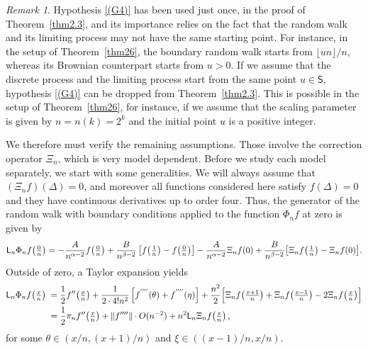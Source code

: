 \documentclass[12pt,a4paper]{article}
\theoremstyle{plain}
\theoremstyle{remark}
\newtheorem{remark}[theorem]{Remark}
\newcommand{\msf}[1]{{\mathsf #1}}
\newcommand{\pfrac}[2]{\genfrac{}{}{}{1}{#1}{#2}}
\newcommand{\pn}[1]{\big(\pfrac{#1}{n}\big)}
\begin{document}
	\begin{remark}
		\rm Hypothesis \ref{(G4)} has been used just once, in the proof of Theorem~\ref{thm2.3}, and its importance relies on the fact that the random walk and  its limiting process may not have the same starting point. For instance, in the setup of Theorem~\ref{thm26}, the boundary random walk starts from $\lfloor un\rfloor/n$, whereas its Brownian counterpart starts from $u>0$. If we assume that the discrete process and the limiting process start from the same point $u\in\msf{S}$,  hypothesis \ref{(G4)} can be dropped from Theorem~\ref{thm2.3}. This is possible in the setup of Theorem~\ref{thm26}, for instance, if we assume that the scaling parameter is given by $n = n(k) = 2^k$  and the initial point $u$ is a positive integer.
	\end{remark}
	
	
	
	
	
	
	We therefore must  verify the remaining assumptions.
	Those involve the correction operator $\Xi_n$, which is very model dependent. Before we study each model separately, we start with some generalities. We will always assume that $(\Xi_n f)(\Delta)=0$, and moreover all functions considered here satisfy $f(\Delta)=0$ and they have continuous derivatives up to order four. Thus,
	the generator of the random walk with boundary conditions  applied to the function  $\Phi_nf$ at zero is given by
	\begin{equation}\label{eq:3.8}
		\msf{L}_n\Phi_nf\pn{0}=-\frac{A}{n^{\alpha - 2}}f\pn{0}+\frac{B}{n^{\beta - 2}}\left[f\pn{1}-f\pn{0}\right]-\frac{A}{n^{\alpha - 2}}\Xi_nf(0)+\frac{B}{n^{\beta - 2}}\big[\Xi_nf\pn{1} - \Xi_nf(0)\big].
	\end{equation}
	Outside of zero, a Taylor expansion yields
	\begin{align}
		\msf{L}_n\Phi_nf\pn{x} \;=\; &  \frac12 f''\pn{x}+ \frac{1}{2\cdot 4!n^2}\left[f^{''''}(\theta) + f^{''''}(\eta)\right]  + \frac{n^2}{2}\Big[\Xi_nf\pn{x+1} + \Xi_nf\pn{x-1} - 2\Xi_nf\pn{x}\Big]\notag\\
		\;=\; &  \frac12\pi_n  f''\pn{x}+ \Vert  f''''\Vert \cdot  O(n^{-2})  + n^2\msf{L}_n \Xi_n f \pn{x}\,,\label{lastline}
	\end{align}
	for some $\theta \in (x/n, (x+1)/n)$ and $\xi \in ((x - 1)/n, x/n)$.
	
	
	
	
	
	
	
	
	
\end{document}
